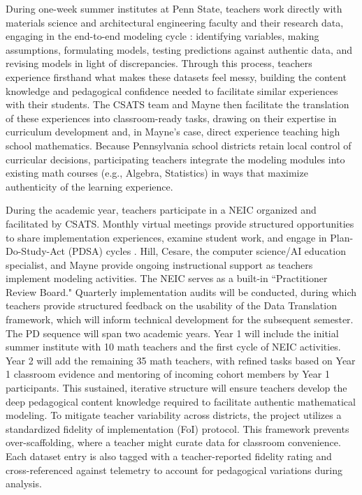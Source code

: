 \documentclass[11pt]{article}
\begin{document}
During one-week summer institutes at Penn State, teachers work directly with materials science and architectural engineering faculty and their research data, engaging in the end-to-end modeling cycle \cite{Garfunkel2019}: identifying variables, making assumptions, formulating models, testing predictions against authentic data, and revising models in light of discrepancies. Through this process, teachers experience firsthand what makes these datasets feel messy, building the content knowledge and pedagogical confidence needed to facilitate similar experiences with their students. The CSATS team and Mayne then facilitate the translation of these experiences into classroom-ready tasks, drawing on their expertise in curriculum development and, in Mayne's case, direct experience teaching high school mathematics. Because Pennsylvania school districts retain local control of curricular decisions, participating teachers integrate the modeling modules into existing math courses (e.g., Algebra, Statistics) in ways that maximize authenticity of the learning experience. 

During the academic year, teachers participate in a NEIC organized and facilitated by CSATS. 
Monthly virtual meetings provide structured opportunities to share implementation experiences, examine student work, and engage in Plan-Do-Study-Act (PDSA) cycles \cite{Bryk2015}. Hill, Cesare, the computer science/AI education specialist, and Mayne provide ongoing instructional support as teachers implement modeling activities.%
The NEIC serves as a built-in ``Practitioner Review Board." Quarterly implementation audits will be conducted, during which teachers provide structured feedback on the usability of the Data Translation framework, which will inform technical development for the subsequent semester.
The PD sequence will span two academic years.
Year 1 will include the initial summer institute with 10 math teachers and the first cycle of NEIC activities.
Year 2 will add the remaining 35 math teachers, with refined tasks based on Year 1 classroom evidence and mentoring of incoming cohort members by Year 1 participants. 
This sustained, iterative structure will ensure teachers develop the deep pedagogical content knowledge required to facilitate authentic mathematical modeling. 
To mitigate teacher variability across districts, the project utilizes a standardized fidelity of implementation (FoI) protocol. 
This framework prevents over-scaffolding, where a teacher might curate data for classroom convenience.
Each dataset entry is also tagged with a teacher-reported fidelity rating and cross-referenced against telemetry to account for pedagogical variations during analysis.
\end{document}
